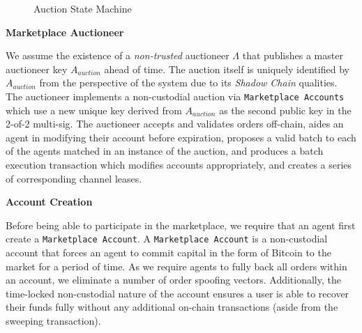 \documentclass[10pt,a4paper]{article}
\theoremstyle{definition}
\begin{document}
\clearpage

\begin{figure}[!htb]


\caption{Auction State Machine}

\end{figure}


\begin{center}
    \textbf{Marketplace Auctioneer}
\end{center}

We assume the existence of a \emph{non-trusted} auctioneer $\Lambda$ that
publishes a master auctioneer key $A_{auction}$ ahead of time. The auction
itself is uniquely identified by $A_{auction}$ from the perspective of the
system due to its \emph{Shadow Chain} qualities. The auctioneer implements a
non-custodial auction via \texttt{Marketplace Accounts} which use a new unique
key derived from $A_{auction}$ as the second public key in the 2-of-2
multi-sig. The auctioneer accepts and validates orders off-chain, aides an
agent in modifying their account before expiration, proposes a valid batch to
each of the agents matched in an instance of the auction, and produces a batch
execution transaction which modifies accounts appropriately, and creates a
series of corresponding channel leases.

\begin{center}
    \textbf{Account Creation}
\end{center}

Before being able to participate in the marketplace, we require that an agent
first create a \texttt{Marketplace Account}. A \texttt{Marketplace Account} is
a non-custodial account that forces an agent to commit capital in the form of
Bitcoin to the market for a period of time. As we require agents to fully back
all orders within an account, we eliminate a number of order spoofing vectors.
Additionally, the time-locked non-custodial nature of the account ensures a user
is able to recover their funds fully without any additional on-chain
transactions (aside from the sweeping transaction).
\end{document}
